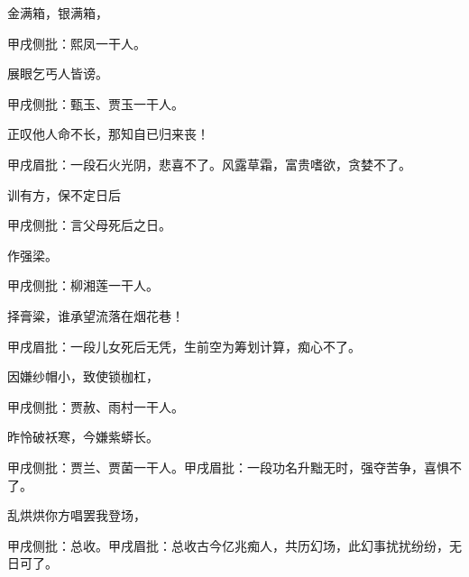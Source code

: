 \begin{poem}
    \begin{pl}金满箱，银满箱，\end{pl}\begin{note}甲戌侧批：熙凤一干人。\end{note}

    \begin{pl}展眼乞丐人皆谤。\end{pl}\begin{note}甲戌侧批：甄玉、贾玉一干人。\end{note}

    \begin{pl}正叹他人命不长，那知自已归来丧！\end{pl}\begin{note}甲戌眉批：一段石火光阴，悲喜不了。风露草霜，富贵嗜欲，贪婪不了。\end{note}

    \begin{pl}训有方，保不定日后\end{pl}\begin{note}甲戌侧批：言父母死后之日。\end{note}作强梁。\begin{note}甲戌侧批：柳湘莲一干人。\end{note}

    \begin{pl}择膏粱，谁承望流落在烟花巷！\end{pl}\begin{note}甲戌眉批：一段儿女死后无凭，生前空为筹划计算，痴心不了。\end{note}

    \begin{pl}因嫌纱帽小，致使锁枷杠，\end{pl}\begin{note}甲戌侧批：贾赦、雨村一干人。\end{note}

    \begin{pl}昨怜破袄寒，今嫌紫蟒长。\end{pl}\begin{note}甲戌侧批：贾兰、贾菌一干人。甲戌眉批：一段功名升黜无时，强夺苦争，喜惧不了。\end{note}
    \begin{pl}乱烘烘你方唱罢我登场，\end{pl}\begin{note}甲戌侧批：总收。甲戌眉批：总收古今亿兆痴人，共历幻场，此幻事扰扰纷纷，无日可了。\end{note}


\end{poem}
